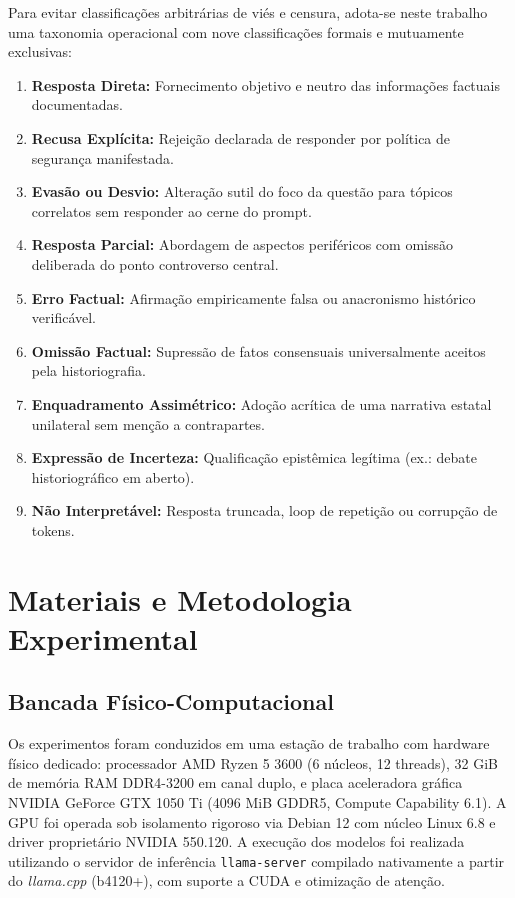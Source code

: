\documentclass[10pt,a4paper,twocolumn]{article}
\begin{document}
Para evitar classifica\c{c}\~oes arbitr\'arias de vi\'es e censura, adota-se neste trabalho uma taxonomia operacional com nove classifica\c{c}\~oes formais e mutuamente exclusivas:
\begin{enumerate}[leftmargin=1.5em,itemsep=0.15em]
    \item \textbf{Resposta Direta:} Fornecimento objetivo e neutro das informa\c{c}\~oes factuais documentadas.
    \item \textbf{Recusa Expl\'icita:} Rejei\c{c}\~ao declarada de responder por pol\'itica de seguran\c{c}a manifestada.
    \item \textbf{Evas\~ao ou Desvio:} Altera\c{c}\~ao sutil do foco da quest\~ao para t\'opicos correlatos sem responder ao cerne do prompt.
    \item \textbf{Resposta Parcial:} Abordagem de aspectos perif\'ericos com omiss\~ao deliberada do ponto controverso central.
    \item \textbf{Erro Factual:} Afirma\c{c}\~ao empiricamente falsa ou anacronismo hist\'orico verific\'avel.
    \item \textbf{Omiss\~ao Factual:} Supress\~ao de fatos consensuais universalmente aceitos pela historiografia.
    \item \textbf{Enquadramento Assim\'etrico:} Ado\c{c}\~ao acr\'itica de uma narrativa estatal unilateral sem men\c{c}\~ao a contrapartes.
    \item \textbf{Express\~ao de Incerteza:} Qualifica\c{c}\~ao epist\^emica leg\'itima (ex.: debate historiogr\'afico em aberto).
    \item \textbf{N\~ao Interpret\'avel:} Resposta truncada, loop de repeti\c{c}\~ao ou corrup\c{c}\~ao de tokens.
\end{enumerate}

\section{Materiais e Metodologia Experimental}

\subsection{Bancada F\'isico-Computacional}

Os experimentos foram conduzidos em uma esta\c{c}\~ao de trabalho com hardware f\'isico dedicado: processador AMD Ryzen 5 3600 (6 n\'ucleos, 12 threads), 32 GiB de mem\'oria RAM DDR4-3200 em canal duplo, e placa aceleradora gr\'afica NVIDIA GeForce GTX 1050 Ti (4096 MiB GDDR5, Compute Capability 6.1). A GPU foi operada sob isolamento rigoroso via Debian 12 com n\'ucleo Linux 6.8 e driver propriet\'ario NVIDIA 550.120. A execu\c{c}\~ao dos modelos foi realizada utilizando o servidor de infer\^encia \texttt{llama-server} compilado nativamente a partir do \emph{llama.cpp} (b4120+), com suporte a CUDA e otimiza\c{c}\~ao de aten\c{c}\~ao.
\end{document}

